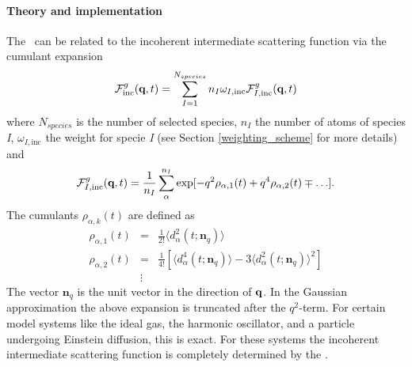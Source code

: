 \documentclass[a4paper,11pt]{report}
\begin{document}
\paragraph{Theory and implementation\\}
\label{disfg_theory}
The \MSD\ can be related to the incoherent intermediate scattering function  via the cumulant expansion
\cite{Rahman:1962,Yip:1980} 
\begin{equation}
\label{eq:fqt_cumulant}
{\cal F}^{g}_{\mathrm{inc}}(\textbf{q},t) = \sum^{N_{species}}_{I = 1} n_I \omega_{I,\mathrm{inc}} {\cal F}^{g}_{I,\mathrm{inc}}(\textbf{q},t)
\end{equation}
where $N_{species}$ is the number of selected species, $n_I$ the number of atoms of species \textit{I}, 
$\omega_{I,\mathrm{inc}}$ the weight for specie \textit{I} (see Section \ref{weighting_scheme} for more details) and
\begin{equation}
\label{eq:fqt_cumulant_1}
{\cal F}^{g}_{I,\mathrm{inc}}(\textbf{q},t) = \frac{1}{n_I}\sum^{n_I}_{\alpha} \exp[-q^2\rho_{\alpha,1}(t) + q^4\rho_{\alpha,2}(t) \mp\ldots].
\end{equation}
The cumulants $\rho_{\alpha,k}(t)$ are defined as
\begin{eqnarray}
\rho_{\alpha,1}(t) &= &\frac{1}{2!}
\langle d^2_\alpha(t;\textbf{n}_q) \rangle \\
\rho_{\alpha,2}(t) &= &\frac{1}{4!}\left[
\langle d_\alpha^4(t;\textbf{n}_q)\rangle - 3\langle d^2_\alpha(t;\textbf{n}_q) 
\rangle^2\right] \\
&\vdots &\nonumber
\end{eqnarray}
The vector $\textbf{n}_q$ is the unit vector in the direction of ${\bf q}$. In the Gaussian approximation the above 
expansion is truncated after the $q^2$-term. For certain model systems like the ideal gas, the harmonic oscillator, 
and a particle undergoing Einstein diffusion, this is exact. For these systems the incoherent intermediate scattering 
function is completely determined by the \MSD.
\end{document}

